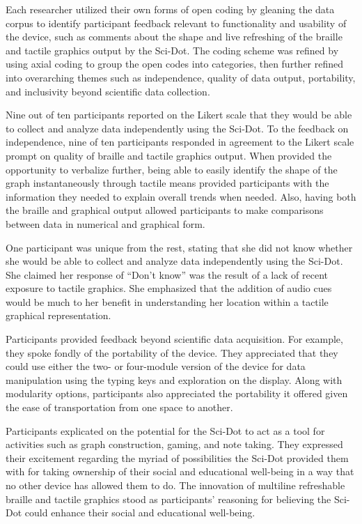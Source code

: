 \documentclass[11.5pt]{sig-alternate}
\begin{document}
\begin{large}
Each researcher utilized their own forms of open coding by gleaning the data corpus to identify participant feedback relevant to functionality and usability of the device, such as comments about the shape and live refreshing of the braille and tactile graphics output by the Sci-Dot. The coding scheme was refined by using axial coding to group the open codes into categories, then further refined into overarching themes such as independence, quality of data output, portability, and inclusivity beyond scientific data collection. 

Nine out of ten participants reported on the Likert scale that they would be able to collect and analyze data independently using the Sci-Dot.  To the feedback on independence, nine of ten participants responded in agreement to the Likert scale prompt on quality of braille and tactile graphics output. When provided the opportunity to verbalize further, being able to easily identify the shape of the graph instantaneously through tactile means provided participants with the information they needed to explain overall trends when needed. Also, having both the braille and graphical output allowed participants to make comparisons between data in numerical and graphical form. 

One participant was unique from the rest, stating that she did not know whether she would be able to collect and analyze data independently using the Sci-Dot. She claimed her response of “Don’t know” was the result of a lack of recent exposure to tactile graphics. She emphasized that the addition of audio cues would be much to her benefit in understanding her location within a tactile graphical representation. 

Participants provided feedback beyond scientific data acquisition. For example, they spoke fondly of the portability of the device. They appreciated that they could use either the two- or four-module version of the device for data manipulation using the typing keys and exploration on the display. Along with modularity options, participants also appreciated the portability it offered given the ease of transportation from one space to another. 

Participants explicated on the potential for the Sci-Dot to act as a tool for activities such as graph construction, gaming, and note taking. They expressed their excitement regarding the myriad of possibilities the Sci-Dot provided them with for taking ownership of their social and educational well-being in a way that no other device has allowed them to do. The innovation of multiline refreshable braille and tactile graphics stood as participants’ reasoning for believing the Sci-Dot could enhance their social and educational well-being. 


\end{large}
\end{document}
